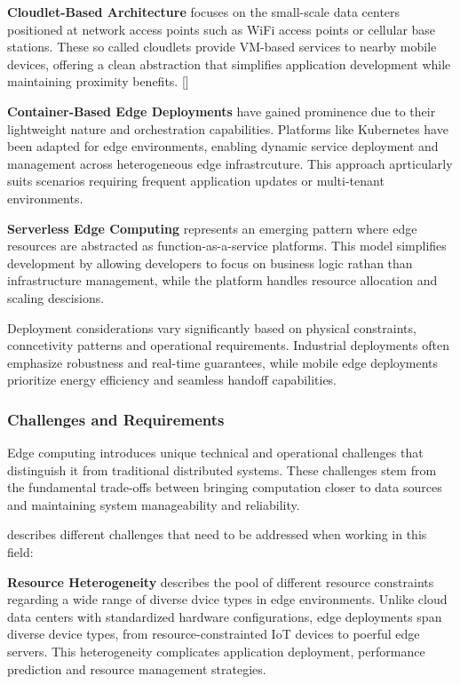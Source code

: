 \textbf{Cloudlet-Based Architecture} focuses on the small-scale data centers positioned at network access points such as WiFi access points or cellular base stations. 
These so called cloudlets provide VM-based services to nearby mobile devices, offering a clean abstraction that simplifies application development while maintaining proximity benefits. [\cite{5280678}]

\textbf{Container-Based Edge Deployments} have gained prominence due to their lightweight nature and orchestration capabilities. Platforms like Kubernetes have been adapted for edge environments, enabling dynamic service deployment and management across heterogeneous edge infrastrcuture.
This approach aprticularly suits scenarios requiring frequent application updates or multi-tenant environments.

\textbf{Serverless Edge Computing} represents an emerging pattern where edge resources are abstracted as function-as-a-service platforms. 
This model simplifies development by allowing developers to focus on business logic rathan than infrastructure management, while the platform handles resource allocation and scaling descisions.

Deployment considerations vary significantly based on physical constraints, conncetivity patterns and operational requirements.
Industrial deployments often emphasize robustness and real-time guarantees, while mobile edge deployments prioritize energy efficiency and seamless handoff capabilities.

\subsubsection{Challenges and Requirements}
Edge computing introduces unique technical and operational challenges that distinguish it from traditional distributed systems.
These challenges stem from the fundamental trade-offs between bringing computation closer to data sources and maintaining system manageability and reliability.

\cite{7488250} describes different challenges that need to be addressed when working in this field:

\textbf{Resource Heterogeneity} describes the pool of different resource constraints regarding a wide range of diverse dvice types in edge environments. 
Unlike cloud data centers with standardized hardware configurations, edge deployments span diverse device types, from resource-constrainted IoT devices to poerful edge servers. 
This heterogeneity complicates application deployment, performance prediction and resource management strategies.

